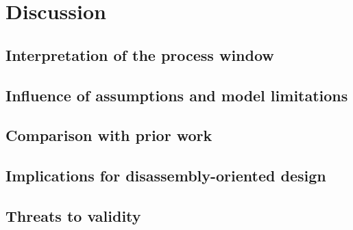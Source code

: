 \chapter{Discussion}

\section{Interpretation of the process window}

\section{Influence of assumptions and model limitations}

\section{Comparison with prior work}

\section{Implications for disassembly-oriented design}

\section{Threats to validity}
